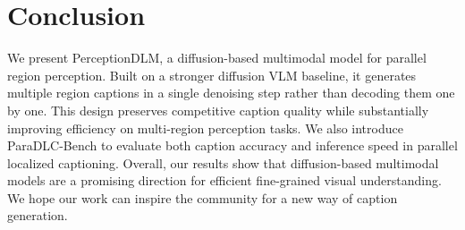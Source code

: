 \vspace{-3mm}
\section{Conclusion}
\label{sec:conclusion}
\vspace{-3mm}
We present PerceptionDLM, a diffusion-based multimodal model for parallel region perception.
Built on a stronger diffusion VLM baseline, it generates multiple region captions in a single denoising step rather than decoding them one by one.
%
This design preserves competitive caption quality while substantially improving efficiency on multi-region perception tasks.
%
We also introduce ParaDLC-Bench to evaluate both caption accuracy and inference speed in parallel localized captioning.
%
Overall, our results show that diffusion-based multimodal models are a promising direction for efficient fine-grained visual understanding.
%
We hope our work can inspire the community for a new way of caption generation.